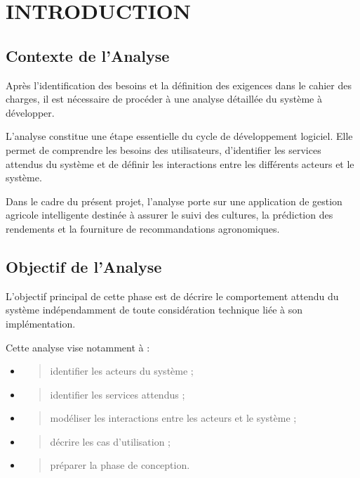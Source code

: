 \hypertarget{chapitre-1-introduction}{%
\chapter{INTRODUCTION}\label{chapitre-1-introduction}}

\hypertarget{contexte-de-lanalyse}{%
\section{Contexte de l'Analyse}\label{contexte-de-lanalyse}}

Après l'identification des besoins et la définition des exigences dans
le cahier des charges, il est nécessaire de procéder à une analyse
détaillée du système à développer.

L'analyse constitue une étape essentielle du cycle de développement
logiciel. Elle permet de comprendre les besoins des utilisateurs,
d'identifier les services attendus du système et de définir les
interactions entre les différents acteurs et le système.

Dans le cadre du présent projet, l'analyse porte sur une application de
gestion agricole intelligente destinée à assurer le suivi des cultures,
la prédiction des rendements et la fourniture de recommandations
agronomiques.

\hypertarget{objectif-de-lanalyse}{%
\section{Objectif de l'Analyse}\label{objectif-de-lanalyse}}

L'objectif principal de cette phase est de décrire le comportement
attendu du système indépendamment de toute considération technique liée
à son implémentation.

Cette analyse vise notamment à :

\begin{itemize}
\item
  \begin{quote}
  identifier les acteurs du système ;
  \end{quote}
\item
  \begin{quote}
  identifier les services attendus ;
  \end{quote}
\item
  \begin{quote}
  modéliser les interactions entre les acteurs et le système ;
  \end{quote}
\item
  \begin{quote}
  décrire les cas d'utilisation ;
  \end{quote}
\item
  \begin{quote}
  préparer la phase de conception.
  \end{quote}
\end{itemize}

